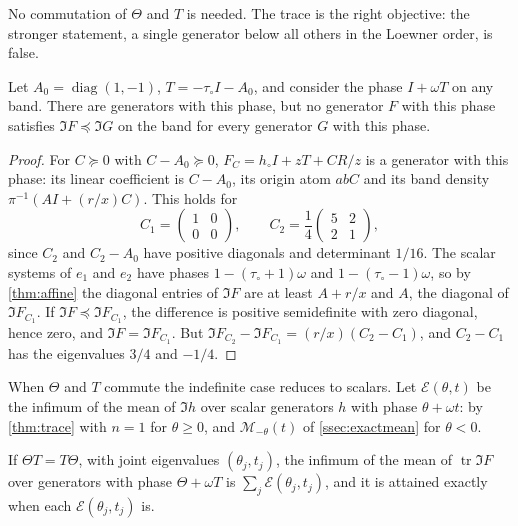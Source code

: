 No commutation of $\Theta$ and $T$ is needed. The trace is the right
objective: the stronger statement, a single generator below all others in
the Loewner order, is false.

\begin{theorem}\label{thm:noloewner}
Let $A_0=\operatorname{diag}(1,-1)$, $T=-\tau_\circ I-A_0$, and consider the
phase $I+\omega T$ on any band. There are generators with this phase, but no
generator $F$ with this phase satisfies $\Im F\preceq\Im G$ on the band for
every generator $G$ with this phase.
\end{theorem}

\begin{proof}
For $C\succeq0$ with $C-A_0\succeq0$, $F_C=h_\circ I+zT+CR/z$ is a generator
with this phase: its linear coefficient is $C-A_0$, its origin atom $abC$ and
its band density $\pi^{-1}(AI+(r/x)C)$. This holds for
\[
C_1=\begin{pmatrix}1&0\\0&0\end{pmatrix},\qquad
C_2=\frac14\begin{pmatrix}5&2\\2&1\end{pmatrix},
\]
since $C_2$ and $C_2-A_0$ have positive diagonals and determinant $1/16$.
The scalar systems of $e_1$ and $e_2$ have phases $1-(\tau_\circ+1)\omega$ and
$1-(\tau_\circ-1)\omega$, so by \cref{thm:affine} the diagonal entries of
$\Im F$ are at least $A+r/x$ and $A$, the diagonal of $\Im F_{C_1}$. If
$\Im F\preceq\Im F_{C_1}$, the difference is positive semidefinite with zero
diagonal, hence zero, and $\Im F=\Im F_{C_1}$. But
$\Im F_{C_2}-\Im F_{C_1}=(r/x)(C_2-C_1)$, and $C_2-C_1$ has the eigenvalues
$3/4$ and $-1/4$.
\end{proof}

When $\Theta$ and $T$ commute the indefinite case reduces to scalars. Let
$\mathcal E(\theta,t)$ be the infimum of the mean of $\Im h$ over scalar
generators $h$ with phase $\theta+\omega t$: by \cref{thm:trace} with $n=1$ for
$\theta\ge0$, and $\mathcal M_{-\theta}(t)$ of \cref{ssec:exactmean} for $\theta<0$.

\begin{proposition}\label{prop:commuting}
If $\Theta T=T\Theta$, with joint eigenvalues $(\theta_j,t_j)$, the infimum of
the mean of $\operatorname{tr}\Im F$ over generators with phase $\Theta+\omega T$
is $\sum_j\mathcal E(\theta_j,t_j)$, and it is attained exactly when each
$\mathcal E(\theta_j,t_j)$ is.
\end{proposition}

